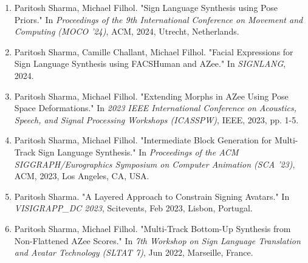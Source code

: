 \documentclass[../../main.tex]{subfiles}
\begin{document}
\begin{enumerate}
    \item Paritosh Sharma, Michael Filhol. "Sign Language Synthesis using Pose Priors." In \textit{Proceedings of the 9th International Conference on Movement and Computing (MOCO '24)}, ACM, 2024, Utrecht, Netherlands.
    
    \item Paritosh Sharma, Camille Challant, Michael Filhol. "Facial Expressions for Sign Language Synthesis using FACSHuman and AZee." In \textit{SIGNLANG}, 2024.
    
    \item Paritosh Sharma, Michael Filhol. "Extending Morphs in AZee Using Pose Space Deformations." In \textit{2023 IEEE International Conference on Acoustics, Speech, and Signal Processing Workshops (ICASSPW)}, IEEE, 2023, pp. 1-5.
    
    \item Paritosh Sharma, Michael Filhol. "Intermediate Block Generation for Multi-Track Sign Language Synthesis." In \textit{Proceedings of the ACM SIGGRAPH/Eurographics Symposium on Computer Animation (SCA '23)}, ACM, 2023, Los Angeles, CA, USA.
    
    \item Paritosh Sharma. "A Layered Approach to Constrain Signing Avatars." In \textit{VISIGRAPP\_DC 2023}, Scitevents, Feb 2023, Lisbon, Portugal.
    
    \item Paritosh Sharma, Michael Filhol. "Multi-Track Bottom-Up Synthesis from Non-Flattened AZee Scores." In \textit{7th Workshop on Sign Language Translation and Avatar Technology (SLTAT 7)}, Jun 2022, Marseille, France.
\end{enumerate}
\end{document}
